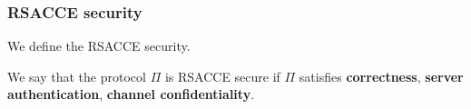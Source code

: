 \subsubsection{RSACCE security}
We define the RSACCE security.

\begin{definition}
 We say that the protocol $\Pi$ is RSACCE secure if $\Pi$ satisfies \textbf{correctness},
 \textbf{server authentication}, \textbf{channel confidentiality}.
\end{definition}